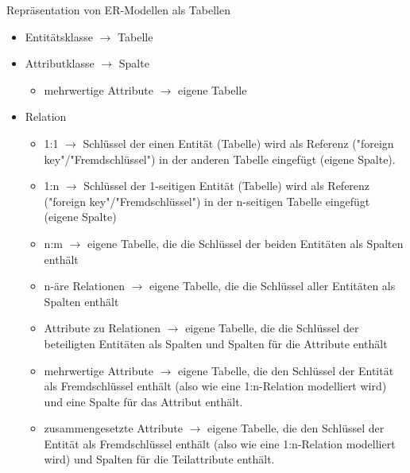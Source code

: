 \begin{frame}[allowframebreaks]{Repräsentation von ER-Modellen als Tabellen}
    \begin{itemize}
        \item Entitätsklasse $\to$ Tabelle
        \item Attributklasse $\to$ Spalte
        \begin{itemize}
            \item mehrwertige Attribute $\to$ eigene Tabelle
        \end{itemize}
        \item Relation
            \begin{itemize}
                \item 1:1 $\to$ Schlüssel der einen Entität (Tabelle) wird als Referenz ("foreign key"/"Fremdschlüssel") in der anderen Tabelle eingefügt (eigene Spalte). 
                \item 1:n $\to$ Schlüssel der 1-seitigen Entität (Tabelle) wird als Referenz ("foreign key"/"Fremdschlüssel") in der n-seitigen Tabelle eingefügt (eigene Spalte)
                \item n:m $\to$ eigene Tabelle, die die Schlüssel der beiden Entitäten als Spalten enthält
                \item n-äre Relationen $\to$ eigene Tabelle, die die Schlüssel aller Entitäten als Spalten enthält
                \item Attribute zu Relationen $\to$ eigene Tabelle, die die Schlüssel der beteiligten Entitäten als Spalten und Spalten für die Attribute enthält
                \item mehrwertige Attribute $\to$ eigene Tabelle, die den Schlüssel der Entität als Fremdschlüssel enthält (also wie eine 1:n-Relation modelliert wird) und eine Spalte für das Attribut enthält.
                \item zusammengesetzte Attribute $\to$ eigene Tabelle, die den Schlüssel der Entität als Fremdschlüssel enthält (also wie eine 1:n-Relation modelliert wird) und Spalten für die  Teilattribute enthält.
            \end{itemize}
    \end{itemize}
\end{frame}

